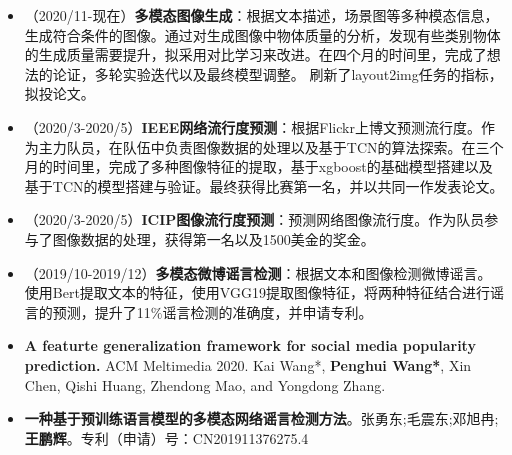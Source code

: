 \documentclass[zh]{resume}
\begin{document}
\begin{itemize}
  \item  （2020/11-现在）\textbf{多模态图像生成}：根据文本描述，场景图等多种模态信息，生成符合条件的图像。通过对生成图像中物体质量的分析，发现有些类别物体的生成质量需要提升，拟采用对比学习来改进。在四个月的时间里，完成了想法的论证，多轮实验迭代以及最终模型调整。 刷新了layout2img任务的指标，拟投论文。
  \item （2020/3-2020/5）\textbf{IEEE网络流行度预测}：根据Flickr上博文预测流行度。作为主力队员，在队伍中负责图像数据的处理以及基于TCN的算法探索。在三个月的时间里，完成了多种图像特征的提取，基于xgboost的基础模型搭建以及基于TCN的模型搭建与验证。最终获得比赛第一名，并以共同一作发表论文。
  \item （2020/3-2020/5）\textbf{ICIP图像流行度预测}：预测网络图像流行度。作为队员参与了图像数据的处理，获得第一名以及1500美金的奖金。
  \item （2019/10-2019/12）\textbf{多模态微博谣言检测}：根据文本和图像检测微博谣言。使用Bert提取文本的特征，使用VGG19提取图像特征，将两种特征结合进行谣言的预测，提升了11$\%$谣言检测的准确度，并申请专利。

\end{itemize}

\begin{itemize}
  \item \textbf{A featurte generalization framework for social media popularity prediction.} ACM Meltimedia 2020. 
  Kai Wang*, \textbf{Penghui Wang*}, Xin Chen, Qishi Huang, Zhendong Mao, and Yongdong Zhang.
  \item \textbf{一种基于预训练语言模型的多模态网络谣言检测方法}。张勇东;毛震东;邓旭冉;\textbf{王鹏辉}。专利（申请）号：CN201911376275.4

\end{itemize}


\end{document}
